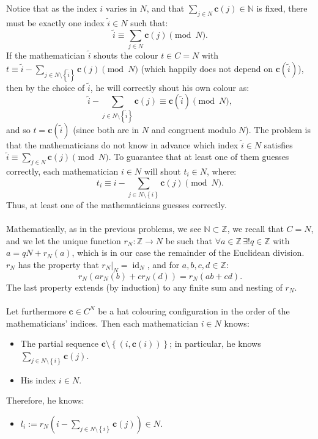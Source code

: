 \documentclass[11pt, a4paper, oneside]{article}
\theoremstyle{remark}
\theoremstyle{lemma}
\begin{document}
Notice that as the index \(i\) varies in \(N\), and that \(\sum_{j \in N} \mathbf{c}(j) \in \mathbb{N}\) is fixed, there must be exactly one index \(\tilde{i} \in N\) such that:
\[
\tilde{i} \equiv \sum_{j \in N} \mathbf{c}(j) \pmod{N}.
\]
If the mathematician \(\tilde{i}\) shouts the colour \(t \in C = N\) with \(t \equiv \tilde{i} - \sum_{j \in N \setminus \left\{\tilde{i}\right\}} \mathbf{c}(j) \pmod{N}\) (which happily does not depend on \(\mathbf{c}(\tilde{i})\)), then by the choice of \(\tilde{i}\), he will correctly shout his own colour as:
\[
\tilde{i} - \sum_{j \in N \setminus \left\{\tilde{i}\right\}} \mathbf{c}(j) \equiv \mathbf{c}(\tilde{i}) \pmod{N},
\]
and so \(t = \mathbf{c}(\tilde{i})\) (since both are in \(N\) and congruent modulo \(N\)). The problem is that the mathematicians do not know in advance which index \(\tilde{i} \in N\) satisfies \(\tilde{i} \equiv \sum_{j \in N} \mathbf{c}(j) \pmod{N}\). To guarantee that at least one of them guesses correctly, each mathematician \(i \in N\) will shout \(t_i \in N\), where:
\[
t_i \equiv i - \sum_{j \in N \setminus \left\{i\right\}} \mathbf{c}(j) \pmod{N}.
\]
Thus, at least one of the mathematicians guesses correctly.
\\\\
Mathematically, as in the previous problems, we see \(\mathbb{N} \subset \mathbb{Z}\), we recall that \(C = N\), and we let the unique function \(r_{N} : \mathbb{Z} \rightarrow N\) be such that \(\forall a \in \mathbb{Z}\, \exists! q \in \mathbb{Z}\) with \(a = qN + r_{N}(a)\), which is in our case the remainder of the Euclidean division. \(r_N\) has the property that \(r_{N}\big|_{N} = \operatorname{id}_{N}\), and for \(a, b, c, d \in \mathbb{Z}\):
\[
r_{N}\left( a r_{N}\left( b \right) + c r_{N}\left( d \right) \right) = r_{N}\left( ab + cd \right).
\]
The last property extends (by induction) to any finite sum and nesting of \(r_{N}\).
\\\\
Let furthermore \(\mathbf{c} \in C^N\) be a hat colouring configuration in the order of the mathematicians’ indices. Then each mathematician \(i \in N\) knows:
\begin{itemize}
\item The partial sequence \(\mathbf{c} \setminus \left\{\left(i, \mathbf{c}(i)\right)\right\}\); in particular, he knows \(\sum_{j \in N \setminus \left\{i\right\}} \mathbf{c}(j)\).
\item His index \(i \in N\).
\end{itemize}
Therefore, he knows:
\begin{itemize}
    \item  \(l_i := r_{N}\left(i - \sum_{j \in N \setminus \left\{i\right\}} \mathbf{c}(j)\right) \in N.\)
\end{itemize}
\end{document}
